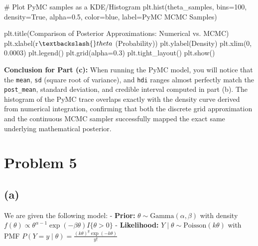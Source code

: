 \documentclass[
  letterpaper,
  DIV=11,
  numbers=noendperiod]{scrartcl}
\newenvironment{Shaded}{\begin{snugshade}}{\end{snugshade}}
\newcommand{\CommentTok}[1]{\textcolor[rgb]{0.37,0.37,0.37}{#1}}
\newcommand{\DecValTok}[1]{\textcolor[rgb]{0.68,0.00,0.00}{#1}}
\newcommand{\FloatTok}[1]{\textcolor[rgb]{0.68,0.00,0.00}{#1}}
\newcommand{\NormalTok}[1]{\textcolor[rgb]{0.00,0.23,0.31}{#1}}
\newcommand{\OperatorTok}[1]{\textcolor[rgb]{0.37,0.37,0.37}{#1}}
\newcommand{\StringTok}[1]{\textcolor[rgb]{0.13,0.47,0.30}{#1}}
\newcommand{\VariableTok}[1]{\textcolor[rgb]{0.07,0.07,0.07}{#1}}
\newcommand{\VerbatimStringTok}[1]{\textcolor[rgb]{0.13,0.47,0.30}{#1}}
\begin{document}
\begin{Shaded}
\begin{Highlighting}[]
\CommentTok{\# Plot PyMC samples as a KDE/Histogram}
\NormalTok{plt.hist(theta\_samples, bins}\OperatorTok{=}\DecValTok{100}\NormalTok{, density}\OperatorTok{=}\VariableTok{True}\NormalTok{, alpha}\OperatorTok{=}\FloatTok{0.5}\NormalTok{, color}\OperatorTok{=}\StringTok{\textquotesingle{}blue\textquotesingle{}}\NormalTok{, label}\OperatorTok{=}\StringTok{\textquotesingle{}PyMC MCMC Samples\textquotesingle{}}\NormalTok{)}

\NormalTok{plt.title(}\StringTok{\textquotesingle{}Comparison of Posterior Approximations: Numerical vs. MCMC\textquotesingle{}}\NormalTok{)}
\NormalTok{plt.xlabel(}\VerbatimStringTok{r\textquotesingle{}$\textbackslash{}theta$ (Probability)\textquotesingle{}}\NormalTok{)}
\NormalTok{plt.ylabel(}\StringTok{\textquotesingle{}Density\textquotesingle{}}\NormalTok{)}
\NormalTok{plt.xlim(}\DecValTok{0}\NormalTok{, }\FloatTok{0.0003}\NormalTok{)}
\NormalTok{plt.legend()}
\NormalTok{plt.grid(alpha}\OperatorTok{=}\FloatTok{0.3}\NormalTok{)}
\NormalTok{plt.tight\_layout()}
\NormalTok{plt.show()}
\end{Highlighting}
\end{Shaded}

\textbf{Conclusion for Part (c):} When running the PyMC model, you will
notice that the \texttt{mean}, \texttt{sd} (square root of variance),
and \texttt{hdi} ranges almost perfectly match the \texttt{post\_mean},
standard deviation, and credible interval computed in part (b). The
histogram of the PyMC trace overlaps exactly with the density curve
derived from numerical integration, confirming that both the discrete
grid approximation and the continuous MCMC sampler successfully mapped
the exact same underlying mathematical posterior.

\section{Problem 5}\label{problem-5}

\subsection{(a)}\label{a-3}

We are given the following model: - \textbf{Prior:}
\(\theta \sim \text{Gamma}(\alpha, \beta)\) with density
\(f(\theta) \propto \theta^{\alpha - 1} \exp(-\beta \theta) I\{\theta > 0\}\)
- \textbf{Likelihood:} \(Y \mid \theta \sim \text{Poisson}(k \theta)\)
with PMF
\(P(Y = y \mid \theta) = \frac{(k\theta)^y \exp(-k\theta)}{y!}\)
\end{document}
